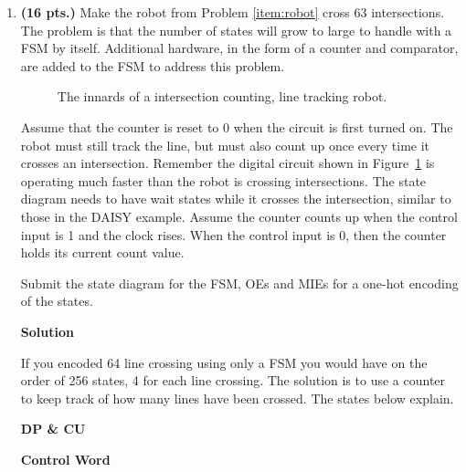 \begin{enumerate}
    \item \textbf{ (16 pts.)}
        Make the robot from Problem \ref{item:robot} cross 63 intersections.
        The problem is that the number of states will grow to large to handle
        with a FSM by itself.  Additional hardware, in the form of a counter
        and comparator, are added to the FSM to address this problem.

        \begin{figure}[ht]
            \caption{The innards of a intersection counting, line tracking robot.}
            \label{fig:linecounter}
        \end{figure}

        Assume that the counter is reset to 0 when the circuit
        is first turned on.  The robot must still track the line, but
        must also count up once every time it crosses an intersection.  Remember
        the digital circuit shown in Figure~\ref{fig:linecounter} is
        operating much faster than the robot is crossing intersections.
        The state diagram needs to have wait states while it crosses
        the intersection, similar to those
        in the DAISY example.  Assume the counter counts up
        when the control input is 1 and the clock rises.  When the control
        input is 0, then the counter holds its current count value.

        Submit the state diagram for the FSM, OEs and MIEs for a one-hot
        encoding of the states.

        \begin{onlysolution}  \textbf{Solution} \itshape{
                \pagebreak
                If you encoded 64 line crossing using only a FSM you would have
                on the order of 256 states, 4 for each line crossing.  The solution
                is to use a counter to keep track of how many lines have been crossed.
                The states below explain.

                \textbf{ DP \& CU}

                \begin{figure}[ht]
                \end{figure}

                \textbf{ Control Word}

}
\end{onlysolution}
\end{enumerate}
